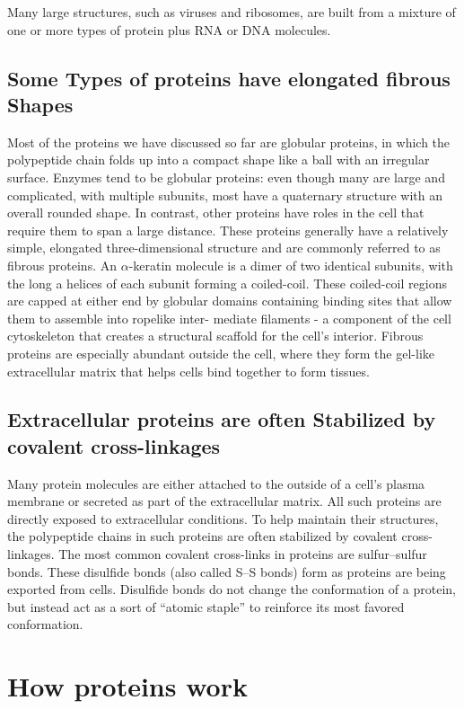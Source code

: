 Many large structures, such as viruses and ribosomes, are built from a
mixture of one or more types of protein plus RNA or DNA molecules.

\subsection{Some Types of proteins have elongated fibrous Shapes}

Most of the proteins we have discussed so far are globular proteins, in
which the polypeptide chain folds up into a compact shape like a ball
with an irregular surface. Enzymes tend to be globular proteins: even
though many are large and complicated, with multiple subunits, most
have a quaternary structure with an overall rounded shape. 
In contrast, other proteins have roles in the cell that require them to
span a large distance. These proteins generally have a relatively simple,
elongated three-dimensional structure and are commonly referred to as
fibrous proteins.
An $\alpha$-keratin molecule is a dimer of two identical subunits, with the
long a helices of each subunit forming a coiled-coil.
These coiled-coil regions are capped at either end by globular domains
containing binding sites that allow them to assemble into ropelike inter-
mediate filaments - a component of the cell cytoskeleton that creates a
structural scaffold for the cell’s interior.
Fibrous proteins are especially abundant outside the cell, where they
form the gel-like extracellular matrix that helps cells bind together to form
tissues.

\subsection{Extracellular proteins are often Stabilized by covalent cross-linkages}

Many protein molecules are either attached to the outside of a cell’s
plasma membrane or secreted as part of the extracellular matrix. All such
proteins are directly exposed to extracellular conditions. To help maintain 
their structures, the polypeptide chains in such proteins are often
stabilized by covalent cross-linkages.
The most common covalent cross-links
in proteins are sulfur–sulfur bonds. These disulfide bonds (also called
S–S bonds) form as proteins are being exported from cells.
Disulfide bonds do not change the
conformation of a protein, but instead act as a sort of “atomic staple”
to reinforce its most favored conformation.

\section{How proteins work}


